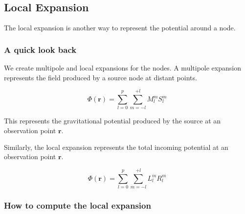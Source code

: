 \subsection{Local Expansion}

The local expansion is another way to represent the potential around a node.

\subsubsection{A quick look back}

We create multipole and local expansions for the nodes. A multipole expansion represents the field produced by a source node at distant points.

\[
\Phi(\mathbf{r})
=
\sum_{l=0}^{p}
\sum_{m=-l}^{+l}
M_{l}^{m}
S_{l}^{m}
\]

This represents the gravitational potential produced by the source at an observation point \(\mathbf{r}\).

Similarly, the local expansion represents the total incoming potential at an observation point \(\mathbf{r}\).

\[
\Phi(\mathbf{r})
=
\sum_{l=0}^{p}
\sum_{m=-l}^{+l}
L_{l}^{m}
R_{l}^{m}
\]

\subsubsection{How to compute the local expansion}